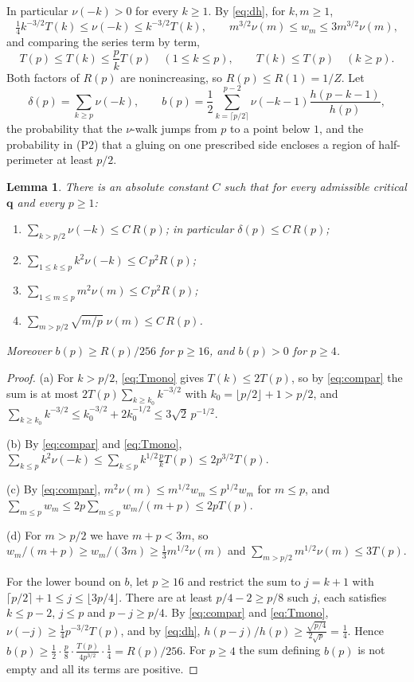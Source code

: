 \documentclass[11pt]{amsart}
\newtheorem{lemma}[theorem]{Lemma}
\theoremstyle{remark}
\numberwithin{equation}{section}
\newcommand{\1}{\mathbf 1}
\begin{document}
In particular $\nu(-k)>0$ for every $k\ge1$. By \eqref{eq:dh}, for $k,m\ge1$,
\begin{equation}\label{eq:compar}
\tfrac14k^{-3/2}T(k)\le\nu(-k)\le k^{-3/2}T(k),\qquad m^{3/2}\nu(m)\le w_m\le3m^{3/2}\nu(m),
\end{equation}
and comparing the series term by term,
\begin{equation}\label{eq:Tmono}
T(p)\le T(k)\le\frac pkT(p)\quad(1\le k\le p),\qquad T(k)\le T(p)\quad(k\ge p).
\end{equation}
Both factors of $R(p)$ are nonincreasing, so $R(p)\le R(1)=1/Z$. Let
\[
\delta(p)=\sum_{k\ge p}\nu(-k),\qquad b(p)=\frac12\sum_{k=\lceil p/2\rceil}^{p-2}\nu(-k-1)\frac{h(p-k-1)}{h(p)},
\]
the probability that the $\nu$-walk jumps from $p$ to a point below $1$, and the probability in (P2) that a gluing on one prescribed side encloses a region of half-perimeter at least $p/2$.

\begin{lemma}\label{lem:est}
There is an absolute constant $C$ such that for every admissible critical $\mathbf q$ and every $p\ge1$:
\begin{enumerate}[label=\textup{(\alph*)},leftmargin=*]
\item $\sum_{k>p/2}\nu(-k)\le C\,R(p)$; in particular $\delta(p)\le C\,R(p)$;
\item $\sum_{1\le k\le p}k^2\nu(-k)\le C\,p^2R(p)$;
\item $\sum_{1\le m\le p}m^2\nu(m)\le C\,p^2R(p)$;
\item $\sum_{m>p/2}\sqrt{m/p}\;\nu(m)\le C\,R(p)$.
\end{enumerate}
Moreover $b(p)\ge R(p)/256$ for $p\ge16$, and $b(p)>0$ for $p\ge4$.
\end{lemma}

\begin{proof}
(a) For $k>p/2$, \eqref{eq:Tmono} gives $T(k)\le2T(p)$, so by \eqref{eq:compar} the sum is at most $2T(p)\sum_{k\ge k_0}k^{-3/2}$ with $k_0=\lfloor p/2\rfloor+1>p/2$, and $\sum_{k\ge k_0}k^{-3/2}\le k_0^{-3/2}+2k_0^{-1/2}\le3\sqrt2\,p^{-1/2}$.

(b) By \eqref{eq:compar} and \eqref{eq:Tmono}, $\sum_{k\le p}k^2\nu(-k)\le\sum_{k\le p}k^{1/2}\frac pkT(p)\le2p^{3/2}T(p)$.

(c) By \eqref{eq:compar}, $m^2\nu(m)\le m^{1/2}w_m\le p^{1/2}w_m$ for $m\le p$, and $\sum_{m\le p}w_m\le2p\sum_{m\le p}w_m/(m+p)\le2pT(p)$.

(d) For $m>p/2$ we have $m+p<3m$, so $w_m/(m+p)\ge w_m/(3m)\ge\frac13m^{1/2}\nu(m)$ and $\sum_{m>p/2}m^{1/2}\nu(m)\le3T(p)$.

For the lower bound on $b$, let $p\ge16$ and restrict the sum to $j=k+1$ with $\lceil p/2\rceil+1\le j\le\lfloor3p/4\rfloor$. There are at least $p/4-2\ge p/8$ such $j$, each satisfies $k\le p-2$, $j\le p$ and $p-j\ge p/4$. By \eqref{eq:compar} and \eqref{eq:Tmono}, $\nu(-j)\ge\frac14p^{-3/2}T(p)$, and by \eqref{eq:dh}, $h(p-j)/h(p)\ge\frac{\sqrt{p/4}}{2\sqrt p}=\frac14$. Hence $b(p)\ge\frac12\cdot\frac p8\cdot\frac{T(p)}{4p^{3/2}}\cdot\frac14=R(p)/256$. For $p\ge4$ the sum defining $b(p)$ is not empty and all its terms are positive.
\end{proof}
\end{document}
